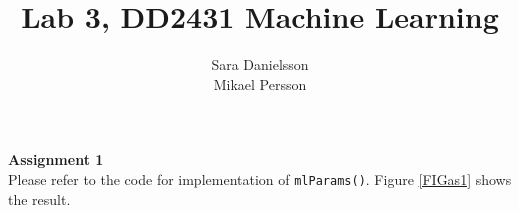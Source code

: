 \documentclass[a4paper,10pt]{article}
\title{Lab 3, DD2431 Machine Learning}
\author{Sara Danielsson \\ Mikael Persson}
\newcommand{\e}{\text{e}}
\begin{document}

\noindent
\textbf{Assignment 1}
\\
Please refer to the code for implementation of \texttt{mlParams()}.
Figure \ref{FIGas1} shows the result.
\end{document}

